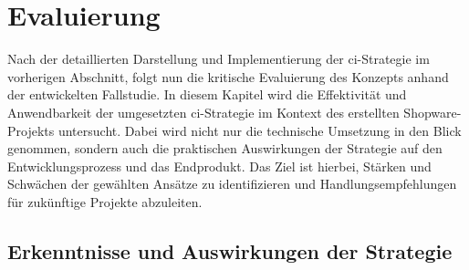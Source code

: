 
\section{Evaluierung} \label{sec:05-evaluation}

Nach der detaillierten Darstellung und Implementierung der \acrshort{ci}-Strategie im vorherigen Abschnitt, folgt nun
die kritische Evaluierung des Konzepts anhand der entwickelten Fallstudie.
In diesem Kapitel wird die Effektivität und Anwendbarkeit der umgesetzten \acrshort{ci}-Strategie im Kontext des
erstellten Shopware-Projekts untersucht.
Dabei wird nicht nur die technische Umsetzung in den Blick genommen, sondern auch die praktischen Auswirkungen der
Strategie auf den Entwicklungsprozess und das Endprodukt.
Das Ziel ist hierbei, Stärken und Schwächen der gewählten Ansätze zu identifizieren und Handlungsempfehlungen für
zukünftige Projekte abzuleiten.

\subsection{Erkenntnisse und Auswirkungen der Strategie} \label{subsec:05-evaluation-1}

